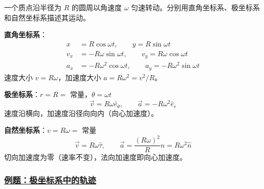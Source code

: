\begin{example}[匀速圆周运动]
    一个质点沿半径为 $R$ 的圆周以角速度 $\omega$ 匀速转动。分别用直角坐标系、极坐标系和自然坐标系描述其运动。
    \begin{solution}
        \textbf{直角坐标系}：
        \begin{align}
            x &= R\cos\omega t, \qquad y = R\sin\omega t \\
            v_x &= -R\omega\sin\omega t, \qquad v_y = R\omega\cos\omega t \\
            a_x &= -R\omega^2\cos\omega t, \qquad a_y = -R\omega^2\sin\omega t
        \end{align}
        速度大小 $v = R\omega$，加速度大小 $a = R\omega^2 = v^2/R$。
        
        \textbf{极坐标系}：$r = R = $ 常量，$\theta = \omega t$
        \begin{equation}
            \vec{v} = R\omega\hat{e}_\theta, \qquad \vec{a} = -R\omega^2\hat{e}_r
        \end{equation}
        速度沿横向，加速度沿径向向内（向心加速度）。
        
        \textbf{自然坐标系}：$v = R\omega = $ 常量
        \begin{equation}
            \vec{v} = R\omega\hat{\tau}, \qquad \vec{a} = \frac{(R\omega)^2}{R}\hat{n} = R\omega^2\hat{n}
        \end{equation}
        切向加速度为零（速率不变），法向加速度即向心加速度。
    \end{solution}
\end{example}

\subsubsection{\protect\hyperlink{:}{例题：极坐标系中的轨迹}}

